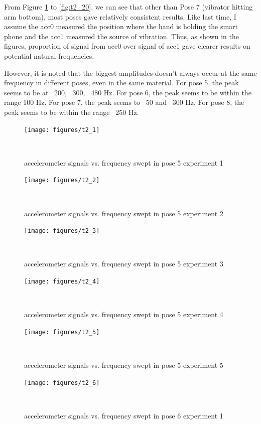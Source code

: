 \documentclass{sigchi}
\begin{document}
From Figure \ref{fig:t2_1} to \ref{fig:t2_20}, we can see that other than Pose 7 (vibrator hitting arm bottom), most poses gave relatively consistent results. Like last time, I assume the acc0 measured the position where the hand is holding the smart phone and the acc1 measured the source of vibration. Thus, as shown in the figures, proportion of signal from acc0 over signal of acc1 gave clearer results on potential natural frequencies.

However, it is noted that the biggest amplitudes doesn't always occur at the same frequency in different poses, even in the same material. For pose 5, the peak seems to be at ~200, ~300, ~480 Hz. For pose 6, the peak seems to be within the range 100 Hz. For pose 7, the peak seems to ~50 and ~300 Hz. For pose 8, the peak seems to be within the range ~250 Hz.

\begin{figure}
  \centering
  \texttt{[image: figures/t2\_1]}
  \caption{accelerometer signals vs. frequency swept in pose 5 experiment 1}
    ~\label{fig:t2_1}
\end{figure}

\begin{figure}
  \centering
  \texttt{[image: figures/t2\_2]}
  \caption{accelerometer signals vs. frequency swept in pose 5 experiment 2}
    ~\label{fig:t2_2}
\end{figure}

\begin{figure}
  \centering
  \texttt{[image: figures/t2\_3]}
  \caption{accelerometer signals vs. frequency swept in pose 5 experiment 3}
    ~\label{fig:t2_3}
\end{figure}

\begin{figure}
  \centering
  \texttt{[image: figures/t2\_4]}
  \caption{accelerometer signals vs. frequency swept in pose 5 experiment 4}
    ~\label{fig:t2_4}
\end{figure}

\begin{figure}
  \centering
  \texttt{[image: figures/t2\_5]}
  \caption{accelerometer signals vs. frequency swept in pose 5 experiment 5}
    ~\label{fig:t2_5}
\end{figure}

\begin{figure}
  \centering
  \texttt{[image: figures/t2\_6]}
  \caption{accelerometer signals vs. frequency swept in pose 6 experiment 1}
    ~\label{fig:t2_6}
\end{figure}
\end{document}
